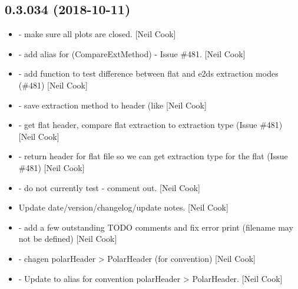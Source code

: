 \documentclass[a4paper,10pt,english]{report}
\begin{document}
\subsection{0.3.034 (2018-10-11)}
\label{\detokenize{misc/changelog:id298}}\begin{itemize}
\item {} 
 - make sure all plots are closed. {[}Neil Cook{]}

\item {} 
 - add alias for 
(CompareExtMethod) - Issue \#481. {[}Neil Cook{]}

\item {} 
 - add  function to test
difference between flat and e2ds extraction modes (\#481) {[}Neil Cook{]}

\item {} 
 - save extraction method to header (like
 {[}Neil Cook{]}

\item {} 
 - get flat header, compare flat extraction
to extraction type  (Issue \#481) {[}Neil Cook{]}

\item {} 
 - return header for flat file so we can get extraction
type for the flat (Issue \#481) {[}Neil Cook{]}

\item {} 
 - do not currently test  -
comment out. {[}Neil Cook{]}

\item {} 
Update date/version/changelog/update notes. {[}Neil Cook{]}

\item {} 
 - add a few outstanding TODO comments and fix error print
(filename may not be defined) {[}Neil Cook{]}

\item {} 
 - chagen polarHeader \textendash{}\textgreater{} PolarHeader (for
convention) {[}Neil Cook{]}

\item {} 
 - Update to alias for convention polarHeader \textendash{}\textgreater{}
PolarHeader. {[}Neil Cook{]}


\end{itemize}
\end{document}

